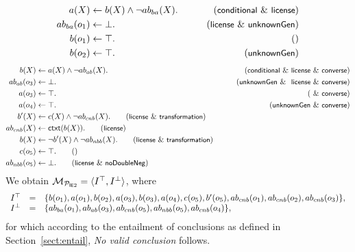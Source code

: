 \documentclass[12pt]{article}
\begin{document}
\begin{align}
a(X) & \leftarrow b(X) \wedge \neg \Ab_{ba}(X). & \tag{\conditionals\ \&\ \licenses}\\
\Ab_{ba}(o_1) & \leftarrow  \bot. & \tag{\licenses\ \& \unknownGen}\\
b(o_1) & \leftarrow  \top. & \tag{} \\
b(o_2) & \leftarrow  \top. & \tag{\unknownGen}
\end{align}
\begin{align}
b(X) & \leftarrow a(X) \wedge \neg \Ab_{ab}(X). & \tag{\conditionals\ \&\ \licenses\ \&\ \converse}\\
\Ab_{ab}(o_3) & \leftarrow  \bot. & \tag{\unknownGen\ \& \ \licenses\ \&\ \converse}\\
a(o_3) & \leftarrow  \top. & \tag{\ \&\ \converse} \\
a(o_4) & \leftarrow  \top. & \tag{\unknownGen\ \& \converse} 
\medskip \\
b'(X) & \leftarrow c(X) \wedge \neg \Ab_{cnb}(X).  \tag{\licenses\ \&\ \transformation} \\
\Ab_{cnb}(X)  & \leftarrow \cxt(b(X)).\tag{\licenses} \\
b(X) & \leftarrow \neg b'(X) \wedge \neg \Ab_{nbb}(X). \tag{\licenses\ \&\ \transformation} \\
c(o_5) & \leftarrow \top. \tag{} \\
\Ab_{nbb}(o_5) & \leftarrow \bot. \tag{\licenses\ \&\  \dnegation}
\end{align}
We obtain ${\cal M}_{{\cal P}_{\tiny\mbox{\textsf{I}\textsf{E}2}}} = \langle I^\top, I^\bot \rangle$, where 
\[
\begin{array}{lll}
 I^\top & = & \{ b(o_1), a(o_1), b(o_2), a(o_3), b(o_3),  a(o_4), c(o_5), b'(o_5), ab_{cnb}(o_1), ab_{cnb}(o_2), ab_{cnb}(o_3)  \}, \\
I^\bot & = & \{ ab_{ba}(o_1), ab_{ab}(o_3), ab_{cnb}(o_5), ab_{nbb}(o_5), ab_{cnb}(o_4) \}, 
\end{array}
\]
for which according to the entailment of conclusions as defined in Section~\ref{sect:entail}, \textit{No valid conclusion}
follows.
\end{document}
